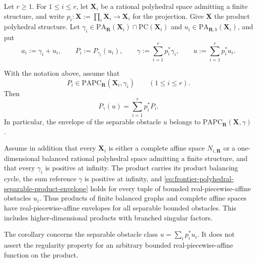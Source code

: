 
Let $r\geq1$.  For $1\leq i\leq r$, let $\mathbf X_i$ be a rational
polyhedral space admitting a finite structure, and write
$p_i:\mathbf X:=\prod_i\mathbf X_i\to\mathbf X_i$ for the projection.  Give
$\mathbf X$ the product polyhedral structure.  Let
$\gamma_i\in\mathrm{PA}_{\mathbf R}(\mathbf X_i)\cap
\mathrm{PC}(\mathbf X_i)$ and
$u_i\in\mathrm{PA}_{\mathbf R,b}(\mathbf X_i)$, and put
\[
 a_i:=\gamma_i+u_i,
 \qquad
 P_i:=P_{\gamma_i}(u_i),
 \qquad
 \gamma:=\sum_{i=1}^r p_i^*\gamma_i,
 \qquad
 u:=\sum_{i=1}^r p_i^*u_i.
\]

\begin{theorem}
\label{thm:frontier-polyhedral-separable-product-envelope}
With the notation above, assume that
\[
 P_i\in
 \mathrm{PAPC}_{\mathbf R}(\mathbf X_i,\gamma_i)
 \qquad(1\leq i\leq r).
\]
Then
\[
 P_\gamma(u)=\sum_{i=1}^r p_i^*P_i.
 \tag{*}\label{eq:frontier-polyhedral-separable-product-envelope}
\]
In particular, the envelope of the separable obstacle $u$ belongs to
$\mathrm{PAPC}_{\mathbf R}(\mathbf X,\gamma)$.
\end{theorem}

\begin{corollary}
\label{cor:frontier-polyhedral-graph-affine-separable-regularity}
Assume in addition that every $\mathbf X_i$ is either a complete affine
space $N_{i,\mathbf R}$ or a one-dimensional balanced rational polyhedral
space admitting a finite structure, and that every $\gamma_i$ is positive
at infinity.  The product carries its product balancing cycle, the sum
reference $\gamma$ is positive at infinity, and
\eqref{eq:frontier-polyhedral-separable-product-envelope} holds for every
tuple of bounded real-piecewise-affine obstacles $u_i$.
Thus products of finite balanced graphs and complete affine spaces have
real-piecewise-affine envelopes for all separable bounded obstacles.  This
includes higher-dimensional products with branched singular factors.
\end{corollary}

The corollary concerns the separable obstacle class
$u=\sum_i p_i^*u_i$.  It does not assert the regularity property for an
arbitrary bounded real-piecewise-affine function on the product.
